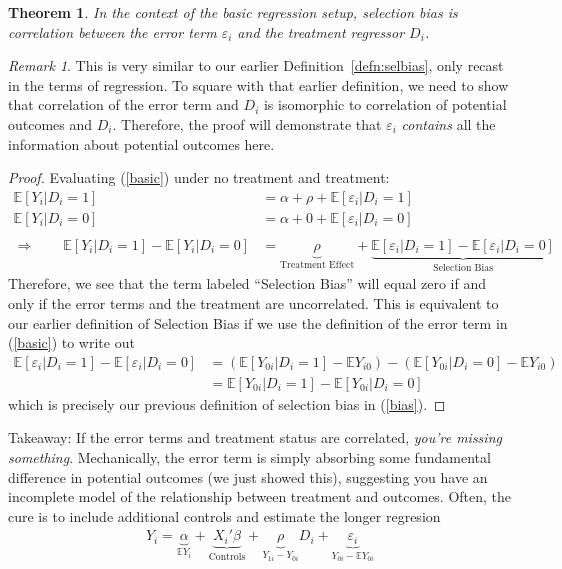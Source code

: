 \documentclass[12pt]{article}
\theoremstyle{plain}
\newtheorem{thm}{Theorem}[section]
\theoremstyle{definition}
\theoremstyle{remark}
\newtheorem*{rmk}{Remark}
\begin{document}
\begin{thm}
In the context of the basic regression setup, selection bias is
correlation between the error term $\varepsilon_i$ and the treatment
regressor $D_i$.
\end{thm}
\begin{rmk}
This is very similar to our earlier Definition~\ref{defn:selbias}, only
recast in the terms of regression. To square with that earlier
definition, we need to show that correlation of the error term and $D_i$
is isomorphic to correlation of potential outcomes and $D_i$. Therefore,
the proof will demonstrate that $\varepsilon_i$ \emph{contains} all the
information about potential outcomes here.
\end{rmk}
\begin{proof}
Evaluating (\ref{basic}) under no treatment and treatment:
\begin{align*}
  \mathbb{E}[Y_i | D_i = 1]
    &= \alpha + \rho + \mathbb{E}[\varepsilon_i | D_i = 1]\\
  \mathbb{E}[Y_i | D_i = 0]
    &= \alpha + 0 + \mathbb{E}[\varepsilon_i | D_i = 0] \\\\
  \Rightarrow\qquad
  \mathbb{E}[Y_i | D_i = 1] - \mathbb{E}[Y_i | D_i = 0]
    &= \underbrace{\rho}_{\text{Treatment Effect}} +
    \underbrace{\mathbb{E}[\varepsilon_i | D_i = 1]
      -\mathbb{E}[\varepsilon_i | D_i = 0]}_{\text{Selection Bias}}
\end{align*}
Therefore, we see that the term labeled ``Selection Bias'' will equal
zero if and only if the error terms and the treatment are uncorrelated.
This is equivalent to our earlier definition of Selection Bias if we use
the definition of the error term in (\ref{basic}) to write out
\begin{align*}
  \mathbb{E}[\varepsilon_i | D_i = 1] -\mathbb{E}[\varepsilon_i | D_i = 0]
  &=
  \left(\mathbb{E}[Y_{0i} | D_i = 1] - \mathbb{E}Y_{i0}\right)
  -\left(\mathbb{E}[Y_{0i} | D_i = 0] - \mathbb{E}Y_{i0} \right)\\
  &=
  \mathbb{E}[Y_{0i} | D_i = 1] -\mathbb{E}[Y_{0i} | D_i = 0]
\end{align*}
which is precisely our previous definition of selection bias in
(\ref{bias}).
\end{proof}

Takeaway: If the error terms and treatment status are correlated,
\emph{you're missing something}. Mechanically, the error term is simply
absorbing some fundamental difference in potential outcomes (we just
showed this), suggesting you have an incomplete model of the
relationship between treatment and outcomes. Often, the cure is to include additional controls and estimate the longer regresion
\begin{align}
  Y_i =
  \underbrace{\alpha}_{\mathbb{E}Y_i}
  + \underbrace{X_i' \beta}_{\text{Controls}}
  + \underbrace{\rho}_{Y_{1i} - Y_{0i}} D_i
  + \underbrace{\varepsilon_i}_{Y_{0i}-\mathbb{E}Y_{0i}}
  \label{longreg}
\end{align}







\end{document}
